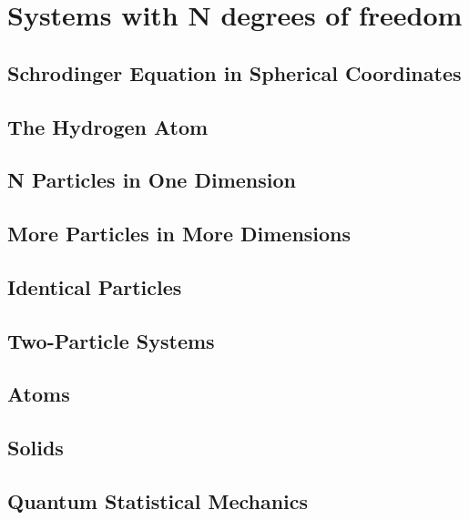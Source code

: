 \chapter{Systems with N degrees of freedom}
\section{Schrodinger Equation in Spherical Coordinates}
\section{The Hydrogen Atom}
\section{N Particles in One Dimension}
\section{More Particles in More Dimensions}
\section{Identical Particles}
\section{Two-Particle Systems}
\section{Atoms}
\section{Solids}
\section{Quantum Statistical Mechanics}